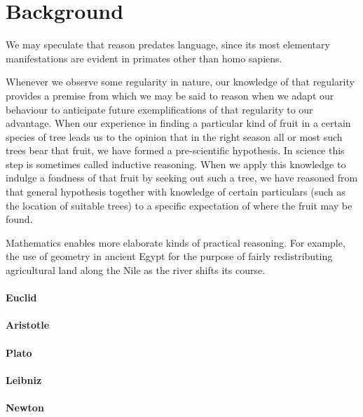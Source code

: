 \documentclass[10pt,titlepage]{book}
\begin{document}
\section{Background}

\nocite{heijenoort67,sabine63,berlin-liberty}

We may speculate that reason predates language, since its most elementary manifestations are evident in primates other than homo sapiens.

Whenever we observe some regularity in nature, our knowledge of that regularity provides a premise from which we may be said to reason when we adapt our behaviour to anticipate future exemplifications of that regularity to our advantage.
When our experience in finding a particular kind of fruit in a certain species of tree leads us to the opinion that in the right season all or most such trees bear that fruit, we have formed a pre-scientific hypothesis.
In science this step is sometimes called inductive reasoning.
When we apply this knowledge to indulge a fondness of that fruit by seeking out such a tree, we have reasoned from that general hypothesis together with knowledge of certain particulars (such as the location of suitable trees) to a specific expectation of where the fruit may be found.

Mathematics enables more elaborate kinds of practical reasoning.
For example, the use of geometry in ancient Egypt for the purpose of fairly redistributing agricultural land along the Nile as the river shifts its course.

\paragraph{Euclid\cite{euclidEL1}}

\paragraph{Aristotle\cite{aristotleL325,aristotleL391,aristotleL400}}

\paragraph{Plato\cite{plato-republic}}

\paragraph{Leibniz\cite{leibniz-pw,leibnizNCT}}

\paragraph{Newton\cite{newton-pm}}
\end{document}
